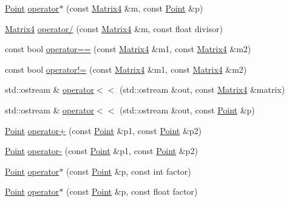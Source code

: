 \begin{DoxyCompactItemize}
\item 
\hyperlink{classprism_1_1geometry_1_1_point}{Point} \hyperlink{namespaceprism_1_1geometry_a0d26abe68011b0b8c1925d9270fcef56}{operator$\ast$} (const \hyperlink{classprism_1_1geometry_1_1_matrix4}{Matrix4} \&m, const \hyperlink{classprism_1_1geometry_1_1_point}{Point} \&p)
\item 
\hyperlink{classprism_1_1geometry_1_1_matrix4}{Matrix4} \hyperlink{namespaceprism_1_1geometry_a8de43a2fb517ad7601c70bee4a676c65}{operator/} (const \hyperlink{classprism_1_1geometry_1_1_matrix4}{Matrix4} \&m, const float divisor)
\item 
const bool \hyperlink{namespaceprism_1_1geometry_adf8b4ec4a2ee785886ced77784913517}{operator==} (const \hyperlink{classprism_1_1geometry_1_1_matrix4}{Matrix4} \&m1, const \hyperlink{classprism_1_1geometry_1_1_matrix4}{Matrix4} \&m2)
\item 
const bool \hyperlink{namespaceprism_1_1geometry_ab7fe0e740d96d5e34a6a12fcf6de8055}{operator!=} (const \hyperlink{classprism_1_1geometry_1_1_matrix4}{Matrix4} \&m1, const \hyperlink{classprism_1_1geometry_1_1_matrix4}{Matrix4} \&m2)
\item 
std\+::ostream \& \hyperlink{namespaceprism_1_1geometry_ade311cd95b7038c8773dd6b851b4d4be}{operator$<$$<$} (std\+::ostream \&out, const \hyperlink{classprism_1_1geometry_1_1_matrix4}{Matrix4} \&matrix)
\item 
std\+::ostream \& \hyperlink{namespaceprism_1_1geometry_ac26df253741dfc5f5d320f3eabeca8a6}{operator$<$$<$} (std\+::ostream \&out, const \hyperlink{classprism_1_1geometry_1_1_point}{Point} \&p)
\item 
\hyperlink{classprism_1_1geometry_1_1_point}{Point} \hyperlink{namespaceprism_1_1geometry_aaa53ebb1c7c8bc1376634d207b5200ed}{operator+} (const \hyperlink{classprism_1_1geometry_1_1_point}{Point} \&p1, const \hyperlink{classprism_1_1geometry_1_1_point}{Point} \&p2)
\item 
\hyperlink{classprism_1_1geometry_1_1_point}{Point} \hyperlink{namespaceprism_1_1geometry_aba6734396128b05c446f9b6c941f7d75}{operator-\/} (const \hyperlink{classprism_1_1geometry_1_1_point}{Point} \&p1, const \hyperlink{classprism_1_1geometry_1_1_point}{Point} \&p2)
\item 
\hyperlink{classprism_1_1geometry_1_1_point}{Point} \hyperlink{namespaceprism_1_1geometry_a26ad30abc76b71837537f47ef973dc08}{operator$\ast$} (const \hyperlink{classprism_1_1geometry_1_1_point}{Point} \&p, const int factor)
\item 
\hyperlink{classprism_1_1geometry_1_1_point}{Point} \hyperlink{namespaceprism_1_1geometry_a7e064d50d45d2c5eee262216b52c3161}{operator$\ast$} (const \hyperlink{classprism_1_1geometry_1_1_point}{Point} \&p, const float factor)

\end{DoxyCompactItemize}
